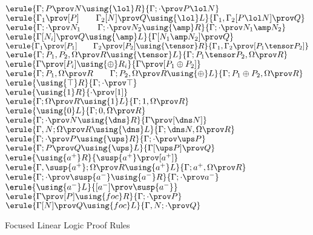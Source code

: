 
\begin{figure}
\begin{center}
\footnotesize
{}
$
\erule
{\Gamma; P \prov  N \using {\lol}R}
{\Gamma; \cdot \prov P \lol N}
$
\gap
$
\erule
{\Gamma_1 \prov [P] \qquad \Gamma_2[N] \prov Q \using {\lol}L}
{\Gamma_1,\Gamma_2 [P \lol N] \prov Q}
$
\gap
$
\erule
{\Gamma;\cdot\prov N_1  \qquad \Gamma;\cdot\prov N_2 \using {\amp}R}
{\Gamma;\cdot\prov N_1\amp N_2 }
$
\gap
$
\erule
{\Gamma [N_i] \prov Q \using {\amp}L}
{\Gamma [N_1 \amp N_2] \prov Q}
$
\gap
$
\erule
{\Gamma_1 \prov [P_1] \qquad \Gamma_2 \prov [P_2]\using {\tensor}R}
{\Gamma_1, \Gamma_2  \prov [P_1 \tensor P_2]}
$
\gap
$
\erule
{\Gamma; P_1, P_2, \Omega \prov R \using {\tensor}L}
{\Gamma; P_1\tensor P_2, \Omega  \prov  R}
$
\gap
$
\erule
{\Gamma \prov [P_i] \using {\oplus}R_i}
{\Gamma  \prov [P_1 \oplus P_2]}
$
\gap
$
\erule
{\Gamma; P_1, \Omega \prov R \qquad \Gamma; P_2, \Omega \prov R\using {\oplus}L}
{\Gamma; P_1\oplus P_2, \Omega \prov R}
$
\gap
$
\erule
{\using {\top}R}
{\Gamma;\cdot  \prov \top}
$
\gap
$
\erule
{\using {1}R}
{ \cdot  \prov [1]}
$
\gap
$
\erule
{\Gamma; \Omega \prov R \using {1}L}
{\Gamma; 1, \Omega \prov R}
$
\gap
$
\erule
{\using {0}L}
{\Gamma; 0, \Omega \prov R}
$
\gap
$
\erule
{\Gamma;\cdot \prov N\using {\dns}R}
{\Gamma  \prov [\dns N]}
$
\gap
$
\erule
{\Gamma, N; \Omega \prov R \using {\dns}L}
{\Gamma; \dns N,  \Omega \prov R}
$
\gap
$
\erule
{\Gamma; \cdot \prov P\using {\ups}R}
{\Gamma; \cdot  \prov \ups P}
$
\gap
$
\erule
{\Gamma; P\prov Q \using {\ups}L}
{\Gamma[\ups P] \prov Q}
$
\gap
$
\erule
{\using {a^+}R}
{ \susp{a^+}  \prov [a^+ ]}
$
\gap
$
\erule
{\Gamma, \susp{a^+}; \Omega\prov R \using {a^+}L}
{\Gamma;  a^+, \Omega  \prov R}
$
\gap
$
\erule
{\Gamma; \cdot \prov \susp{a^-}\using {a^-}R}
{\Gamma; \cdot  \prov a^-}
$
\gap
$
\erule
{\using {a^-}L }
{[a^-] \prov \susp{a^-}}
$
\gap
$
\erule
{\Gamma \prov [P]\using {foc}R}
{\Gamma;\cdot  \prov P}
$
\gap
$
\erule
{\Gamma[N] \prov Q\using {foc}L}
{\Gamma,N;\cdot  \prov Q}
$

\end{center}
\caption{Focused Linear Logic Proof Rules \label{foc-rules}}
\end{figure}
